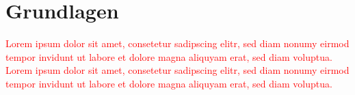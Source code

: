 \section{Grundlagen}
\textcolor{red}{Lorem ipsum dolor sit amet, consetetur sadipscing elitr, sed diam nonumy eirmod tempor invidunt ut labore et dolore magna aliquyam erat, sed diam voluptua. Lorem ipsum dolor sit amet, consetetur sadipscing elitr, sed diam nonumy eirmod tempor invidunt ut labore et dolore magna aliquyam erat, sed diam voluptua.}





\newpage
